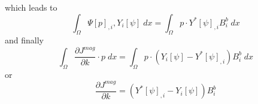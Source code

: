 which leads to 
\begin{equation}\label{ref:MAG:EQU:20ee}
\int_{\Omega} \Psi[p]_{,i} ,Y_i[\psi]  \; dx  = \int_{\Omega}  p \cdot Y^*[\psi]_{,i}  B^b_i \; dx  
\end{equation}
and finally
\begin{equation}\label{ref:MAG:EQU:201a}
\int_{\Omega}   \frac{\partial J^{mag}}{\partial k} \cdot p \;  dx  = \int_{\Omega}  
p \cdot (Y_i[\psi] - Y^*[\psi]_{,i})  B^b_i \; dx  
\end{equation} 
or 
\begin{equation}\label{ref:MAG:EQU:201b}
\frac{\partial J^{mag}}{\partial k} = (Y^*[\psi]_{,i}-Y_i[\psi])  B^b_i
\end{equation}

